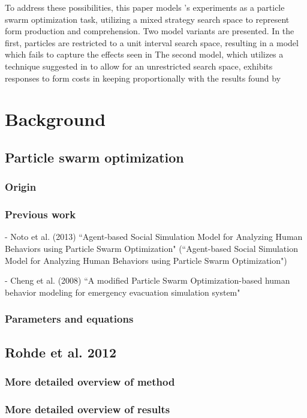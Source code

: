 \documentclass[12pt]{article}
\begin{document}
To address these possibilities, this paper models \citeauthor{rohde2012}'s experiments as a particle swarm optimization task, utilizing a mixed strategy search space to represent form production and comprehension. Two model variants are presented. In the first, particles are restricted to a unit interval search space, resulting in a model which fails to capture the effects seen in \citeauthor{rohde2012} The second model, which utilizes a technique suggested in \citealt[p. 252]{engelbrecht2005} to allow for an unrestricted search space, exhibits responses to form costs in keeping proportionally with the results found by  \citeauthor{rohde2012}



\section{Background}
\subsection{Particle swarm optimization}
\subsubsection{Origin}
\subsubsection{Previous work}
- Noto et al. (2013) ``Agent-based Social Simulation Model for Analyzing Human Behaviors using Particle Swarm Optimization" (``Agent-based Social Simulation Model for Analyzing Human Behaviors using Particle Swarm Optimization")

- Cheng et al. (2008) ``A modified Particle Swarm Optimization-based human behavior modeling for emergency evacuation simulation system"
\subsubsection{Parameters and equations}

\subsection{Rohde et al. 2012}
\subsubsection{More detailed overview of method}
\subsubsection{More detailed overview of results}
\end{document}
